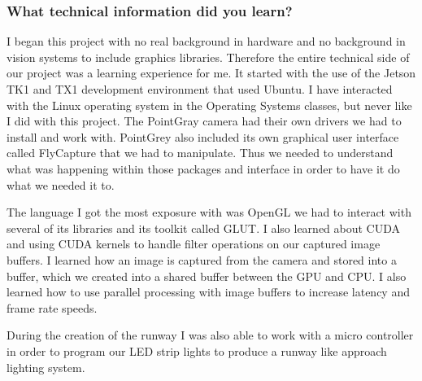 \subsubsection{What technical information did you learn?}
I began this project with no real background in hardware and no background in vision systems to include graphics libraries. Therefore the entire technical side of our project was a learning experience for me. It started with the use of the Jetson TK1 and TX1 development environment that used Ubuntu. I have interacted with the Linux operating system in the Operating Systems classes, but never like I did with this project. The PointGray camera had their own drivers we had to install and work with. PointGrey also included its own graphical user interface called FlyCapture that we had to manipulate. Thus we needed to understand what was happening within those packages and interface in order to have it do what we needed it to. 
\par
The language I got the most exposure with was OpenGL we had to interact with several of its libraries and its toolkit called GLUT. I also learned about CUDA and using CUDA kernels to handle filter operations on our captured image buffers. I learned how an image is captured from the camera and stored into a buffer, which we created into a shared buffer between the GPU and CPU. I also learned how to use parallel processing with image buffers to increase latency and frame rate speeds. 
\par
During the creation of the runway I was also able to work with a micro controller in order to program our LED strip lights to produce a runway like approach lighting system.\\

